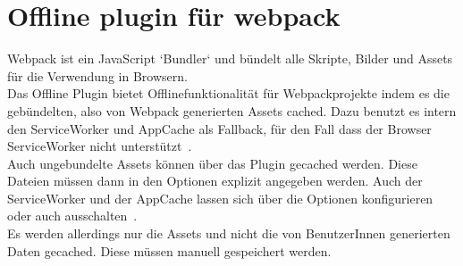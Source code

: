 \section{Offline plugin für webpack}
Webpack ist ein JavaScript `Bundler` und bündelt alle Skripte, Bilder und \gls{Assets} für die Verwendung in Browsern.\\
Das Offline Plugin bietet Offlinefunktionalität für Webpackprojekte indem es die gebündelten, also von Webpack generierten \gls{Assets} cached.
Dazu benutzt es intern den ServiceWorker und AppCache als Fallback, für den Fall dass der Browser ServiceWorker nicht unterstützt~\cite{webpack-gh}.\\
Auch ungebundelte \gls{Assets} können über das Plugin gecached werden. Diese Dateien müssen dann in den Optionen explizit angegeben werden. Auch der ServiceWorker und der AppCache lassen sich über die Optionen konfigurieren oder auch ausschalten~\cite{webpack-opt}.\\
Es werden allerdings nur die \gls{Assets} und nicht die von BenutzerInnen generierten Daten gecached. Diese müssen manuell gespeichert werden.